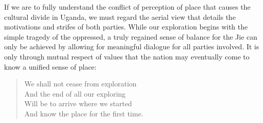 \documentclass[12pt, letterpaper, oneside]{article}
\begin{document}
If we are to fully understand the conflict of perception of place that causes the cultural divide in Uganda, we must regard the aerial view that details the motivations and strifes of both parties. While our exploration begins with the simple tragedy of the oppressed, a truly regained sense of balance for the Jie can only be achieved by allowing for meaningful dialogue for all parties involved. It is only through mutual respect of values that the nation may eventually come to know a unified sense of place:
\begin{quote}
We shall not cease from exploration\\
And the end of all our exploring\\
Will be to arrive where we started\\
And know the place for the first time.

\autocite{eliotfour}
\end{quote}
\clearpage
\printbibliography
\end{document}
